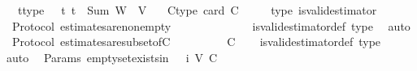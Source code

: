 \begin{isabellebody}
\ \ \ t{\isacharunderscore}type{\isacharcolon}\ {\isachardoublequoteopen}{}\ {\isasymle}\ t{\isachardoublequoteclose}\ {\isachardoublequoteopen}t\ {\isacharless}\ Sum\ {\isacharparenleft}W\ {\isacharbackquote}\ V{\isacharparenright}{\isachardoublequoteclose}\isanewline
\ \ \ C{\isacharunderscore}type{\isacharcolon}\ {\isachardoublequoteopen}card\ C\ {\isachargreater}\ {}{\isachardoublequoteclose}\isanewline
\ \ \ {\isasymepsilon}{\isacharunderscore}type{\isacharcolon}\ {\isachardoublequoteopen}is{\isacharunderscore}valid{\isacharunderscore}estimator\ {\isasymepsilon}{\isachardoublequoteclose}\isanewline
\isanewline
{}\isamarkupfalse%
\ {\isacharparenleft}\ Protocol{\isacharparenright}\ estimates{\isacharunderscore}are{\isacharunderscore}non{\isacharunderscore}empty{\isacharcolon}\ {\isachardoublequoteopen}{\isasymAnd}\ {\isasymsigma}{\isachardot}\ {\isasymsigma}\ {\isasymin}\ {\isasymSigma}\ {\isasymLongrightarrow}\ {\isasymepsilon}\ {\isasymsigma}\ {\isasymnoteq}\ {\isasymemptyset}{\isachardoublequoteclose}\isanewline
%
\isadelimproof
\ \ %
\endisadelimproof
%
\isatagproof
{}\isamarkupfalse%
\ is{\isacharunderscore}valid{\isacharunderscore}estimator{\isacharunderscore}def\ {\isasymepsilon}{\isacharunderscore}type\ \isamarkupfalse%
\ auto%
\endisatagproof
{\isafoldproof}%
%
\isadelimproof
\isanewline
%
\endisadelimproof
\isanewline
{}\isamarkupfalse%
\ {\isacharparenleft}\ Protocol{\isacharparenright}\ estimates{\isacharunderscore}are{\isacharunderscore}subset{\isacharunderscore}of{\isacharunderscore}C{\isacharcolon}\ {\isachardoublequoteopen}{\isasymAnd}\ {\isasymsigma}{\isachardot}\ {\isasymsigma}\ {\isasymin}\ {\isasymSigma}\ {\isasymLongrightarrow}\ {\isasymepsilon}\ {\isasymsigma}\ {\isasymsubseteq}\ C{\isachardoublequoteclose}\isanewline
%
\isadelimproof
\ \ %
\endisadelimproof
%
\isatagproof
{}\isamarkupfalse%
\ is{\isacharunderscore}valid{\isacharunderscore}estimator{\isacharunderscore}def\ {\isasymepsilon}{\isacharunderscore}type\ \isamarkupfalse%
\ auto%
\endisatagproof
{\isafoldproof}%
%
\isadelimproof
\isanewline
%
\endisadelimproof
\isanewline
{}\isamarkupfalse%
\ {\isacharparenleft}\ Params{\isacharparenright}\ empty{\isacharunderscore}set{\isacharunderscore}exists{\isacharunderscore}in{\isacharunderscore}{\isasymSigma}{\isacharunderscore}{}{\isacharcolon}\ {\isachardoublequoteopen}{\isasymemptyset}\ {\isasymin}\ {\isasymSigma}{\isacharunderscore}i\ {\isacharparenleft}V{\isacharcomma}\ C{\isacharcomma}\ {\isasymepsilon}{\isacharparenright}\ {}{\isachardoublequoteclose}\isanewline

\end{isabellebody}
